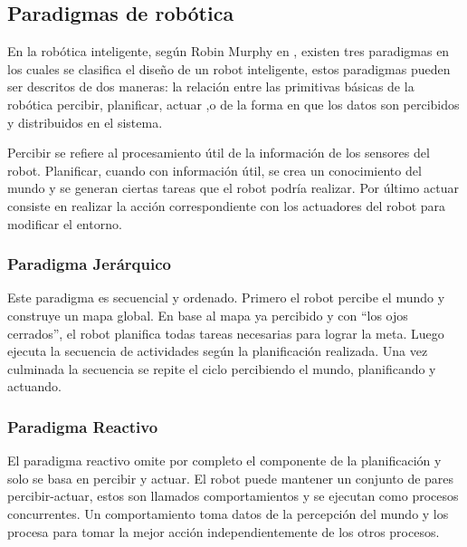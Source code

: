 \subsection{Paradigmas de robótica}
En la robótica inteligente, según Robin Murphy en \cite{AiRobotics}, existen tres paradigmas en los cuales se clasifica el diseño de un robot inteligente, estos paradigmas pueden ser descritos de dos maneras: la relación entre las primitivas básicas de la robótica  percibir, planificar, actuar ,o de la forma en que los datos son percibidos y distribuidos en el sistema.

Percibir se refiere al procesamiento útil de la información de los sensores del robot. Planificar, cuando con información útil, se crea un conocimiento del mundo y se generan ciertas tareas que el robot podría realizar. Por último actuar consiste en realizar la acción correspondiente con los actuadores del robot para modificar el entorno. 

\subsubsection{ Paradigma Jerárquico}

Este paradigma es secuencial y ordenado. Primero el robot percibe el mundo y construye un mapa global. En base al mapa ya percibido y con “los ojos cerrados”, el robot planifica todas tareas necesarias para lograr la meta. Luego ejecuta la secuencia de actividades según la planificación realizada. Una vez culminada la secuencia se repite el ciclo percibiendo el mundo, planificando y actuando. \cite{AiRobotics}

\subsubsection{Paradigma Reactivo}
El paradigma reactivo omite por completo el componente de la planificación y solo se basa en percibir y actuar. El robot puede mantener un conjunto de pares percibir-actuar, estos son llamados comportamientos y se ejecutan como procesos concurrentes. Un comportamiento toma datos de la percepción del mundo y los procesa para tomar la mejor acción independientemente de los otros procesos. \cite{AiRobotics}

